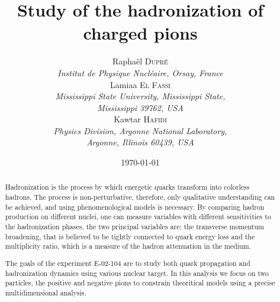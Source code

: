 \documentclass[a4paper,12pt,twoside]{article}
\title{Study of the hadronization of charged pions}
\author{
  Rapha\"el \textsc{Dupr\'e} \\ 
  {\it Institut de Physique Nucl\'eaire, Orsay, France} \\
  Lamiaa \textsc{El Fassi} \\ 
  {\it Mississippi State University, Mississippi State,} \\ 
  {\it Mississippi 39762, USA} \\
  Kawtar \textsc{Hafidi} \\ 
  {\it Physics Division, Argonne National Laboratory,} \\ 
  {\it Argonne, Illinois 60439, USA} 
}
\date{\today}
\begin{document}
\maketitle

\renewcommand{\baselinestretch}{1.10}

\begin{abstract}
Hadronization is the process by which energetic quarks transform into 
colorless hadrons. The process is non-perturbative, therefore, only 
qualitative understanding can be achieved, and using phenomenological models 
is necessary. By comparing hadron production 
on different nuclei, one can measure variables with different sensitivities 
to the hadronization phases, the two principal variables are: the transverse 
momentum broadening, that is believed to be tightly connected to quark energy 
loss and the multiplicity ratio, which is a measure of the hadron attenuation 
in the medium.

The goals of the experiment E-02-104 are to study both quark propagation
and hadronization dynamics using various nuclear target.
In this analysis we focus on two particles, the positive and negative pions
to constrain theoritical models using a precise multidimensional analysis.

\end{abstract}

\newpage

\tableofcontents

\newpage









\end{document}
